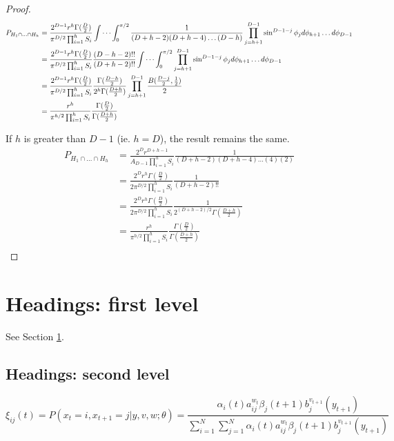 \documentclass{article}
\begin{document}
\begin{proof}
	\begin{align}
		P_{H_1\cap\hdots\cap H_h} &= \frac{2^{D-1}r^h\Gamma(\frac{D}{2})}{\pi^{D/2}\prod_{i=1}^h S_i} \idotsint_0^{\pi/2} \frac{1}{(D+h-2)(D+h-4)\hdots(D-h)} \prod_{j=h+1}^{D-1}\sin^{D-1-j}\phi_j d\phi_{h+1} \hdots d\phi_{D-1} \\
		&= \frac{2^{D-1}r^h\Gamma(\frac{D}{2})}{\pi^{D/2}\prod_{i=1}^h S_i} \frac{(D-h-2)!!}{(D+h-2)!!} \idotsint_0^{\pi/2} \prod_{j=h+1}^{D-1}\sin^{D-1-j}\phi_j d\phi_{h+1} \hdots d\phi_{D-1} \\
		&= \frac{2^{D-1}r^h\Gamma(\frac{D}{2})}{\pi^{D/2}\prod_{i=1}^h S_i} \frac{\Gamma(\frac{D-h}{2})}{2^h \Gamma(\frac{D+h}{2})} \prod_{j=h+1}^{D-1}\frac{B(\frac{D-j}{2}, \frac{1}{2})}{2} \\
		&= \frac{r^{h}}{\pi^{h/2}\prod_{i=1}^h S_i} \frac{\Gamma(\frac{D}{2})}{\Gamma(\frac{D+h}{2})} \\
	\end{align}

	If $h$ is greater than $D-1$ (ie. $h=D$), the result remains the same.
	\begin{align}
		P_{H_1\cap\hdots\cap H_h} &= \frac{2^Dr^{D+h-1}}{A_{D-1}\prod_{i=1}^h S_i}  \frac{1}{(D+h-2)(D+h-4)\hdots(4)(2)}  \\
		&= \frac{2^Dr^{h} \Gamma(\frac{D}{2})}{2 \pi^{D/2} \prod_{i=1}^h S_i} \frac{1}{(D+h-2)!!} \\
		&= \frac{2^Dr^{h} \Gamma(\frac{D}{2})}{2 \pi^{D/2} \prod_{i=1}^h S_i} \frac{1}{2^{(D+h-2)/2} \Gamma(\frac{D+h}{2})} \\
		&= \frac{r^{h}}{\pi^{h/2} \prod_{i=1}^h S_i} \frac{\Gamma(\frac{D}{2})}{\Gamma(\frac{D+h}{2})} \\
	\end{align}


\end{proof}

\section{Headings: first level}
\label{sec:headings}

\lipsum[4] See Section \ref{sec:headings}.

\subsection{Headings: second level}
\lipsum[5]
\begin{equation} 
	\xi _{ij}(t)=P(x_{t}=i,x_{t+1}=j|y,v,w;\theta)= {\frac {\alpha _{i}(t)a^{w_t}_{ij}\beta _{j}(t+1)b^{v_{t+1}}_{j}(y_{t+1})}{\sum _{i=1}^{N} \sum _{j=1}^{N} \alpha _{i}(t)a^{w_t}_{ij}\beta _{j}(t+1)b^{v_{t+1}}_{j}(y_{t+1})}}
\end{equation}
\end{document}
